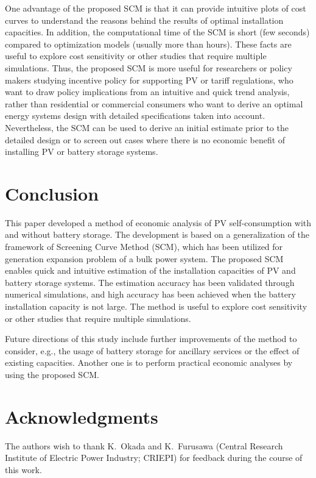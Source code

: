 \documentclass[lettersize,journal]{IEEEtran}
\begin{document}
One advantage of the proposed SCM is that it can provide intuitive plots of cost curves to understand the reasons behind the results of optimal installation capacities.
In addition, the computational time of the SCM is short (few seconds) compared to optimization models (usually more than hours). 
These facts are useful to explore cost sensitivity or other studies that require multiple simulations.
Thus, the proposed SCM is more useful for researchers or policy makers studying incentive policy for supporting PV or tariff regulations, who want to draw policy implications from an intuitive and quick trend analysis, rather than residential or commercial consumers who want to derive an optimal energy systems design with detailed specifications taken into account. 
Nevertheless, the SCM can be used to derive an initial estimate prior to the detailed design or to screen out cases where there is no economic benefit of installing  PV or battery storage systems. 




\section{Conclusion} \label{sec:conclusion}

This paper developed a method of economic analysis of PV self-consumption with and without battery storage.  The development is based on a generalization of the framework of Screening Curve Method (SCM), which has been utilized for generation expansion problem of a bulk power system. 
The proposed SCM enables quick and intuitive estimation of the installation capacities of PV and battery storage systems. 
The estimation accuracy has been validated through numerical simulations, and high accuracy has been achieved when the battery installation capacity is not large. 
The method is useful to explore cost sensitivity or other studies that require multiple simulations.

Future directions of this study include further improvements of the method to consider, e.g., the usage of battery storage for ancillary services or the effect of existing capacities. 
Another one is to perform practical economic analyses by using the proposed SCM. 


\section*{Acknowledgments}

The authors wish to thank K.~Okada and K.~Furusawa (Central Research Institute of Electric Power Industry; CRIEPI) for feedback during the course of this work.




\end{document}
